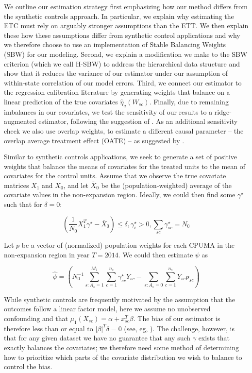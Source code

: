 \documentclass[12pt]{article}
\begin{document}
We outline our estimation strategy first emphasizing how our method differs from the synthetic controls approach. In particular, we explain why estimating the ETC must rely on arguably stronger assumptions than the ETT. We then explain these how these assumptions differ from synthetic control applications and why we therefore choose to use an implementation of Stable Balancing Weights (SBW) for our modeling. Second, we explain a modification we make to the SBW criterion (which we call H-SBW) to address the hierarchical data structure and show that it reduces the variance of our estimator under our assumption of within-state correlation of our model errors. Third, we connect our estimator to the regression calibration literature by generating weights that balance on a linear prediction of the true covariates $\hat{\eta}_a(W_{sc})$. Finally, due to remaining imbalances in our covariates, we test the sensitivity of our results to a ridge-augmented estimator, following the suggestion of \cite{ben2018augmented}. As an additional sensitivity check we also use overlap weights, to estimate a different causal parameter -- the overlap average treatment effect (OATE) -- as suggested by \cite{li2018balancing}.

Similar to synthetic controls applications, we seek to generate a set of positive weights that balance the means of covariates for the treated units to the mean of covariates for the control units. Assume that we observe the true covariate matrices $X_1$ and $X_0$, and let $\bar{X}_0$ be the (population-weighted) average of the covariate values in the non-expansion region. Ideally, we could then find some $\gamma^\star$ such that for $\delta = 0$: 

$$
(\frac{1}{N_0}X_1^T\gamma^\star - \bar{X}_0) \le \delta, \gamma_i^\star > 0, \sum_{sc} \gamma_{sc}^\star = N_0
$$

Let $p$ be a vector of (normalized) population weights for each CPUMA in the non-expansion region in year $T = 2014$. We could then estimate $\psi$ as

$$
\hat{\psi} = (N_0^{-1}\sum_{s: A_s = 1}^{M_1}\sum_{c = 1}^{n_s}\gamma_{sc}^\star Y_{sc} - \sum_{s: A_s = 0}\sum_{c = 1}^{n_s}Y_{sc}p_{sc})
$$

While synthetic controls are frequently motivated by the assumption that the outcomes follow a linear factor model, here we assume no unobserved confounding and that $\mu_1(X_{sc}) = \alpha + x_{sc}^T\beta$. The bias of our estimator is therefore less than or equal to $\lvert\beta\rvert^T\delta = 0$ (see, eg, \cite{zubizarreta2015stable}). The challenge, however, is that for any given dataset we have no guarantee that any such $\gamma$ exists that exactly balances the covariates; we therefore need some method of determining how to prioritize which parts of the covariate distribution we wish to balance to control the bias.
\end{document}
